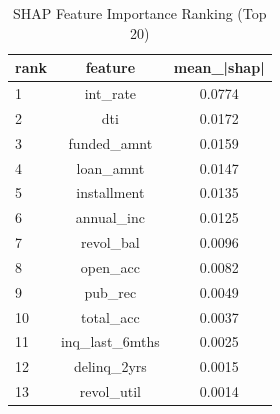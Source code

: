 \begin{table}
\centering
\caption{SHAP Feature Importance Ranking (Top 20)}
\label{tab:shap_ranking}
\begin{tabular}{lcc}
\toprule
rank & feature & mean_|shap| \\
\midrule
1 & int_rate & 0.0774 \\
2 & dti & 0.0172 \\
3 & funded_amnt & 0.0159 \\
4 & loan_amnt & 0.0147 \\
5 & installment & 0.0135 \\
6 & annual_inc & 0.0125 \\
7 & revol_bal & 0.0096 \\
8 & open_acc & 0.0082 \\
9 & pub_rec & 0.0049 \\
10 & total_acc & 0.0037 \\
11 & inq_last_6mths & 0.0025 \\
12 & delinq_2yrs & 0.0015 \\
13 & revol_util & 0.0014 \\
\bottomrule
\end{tabular}
\end{table}
